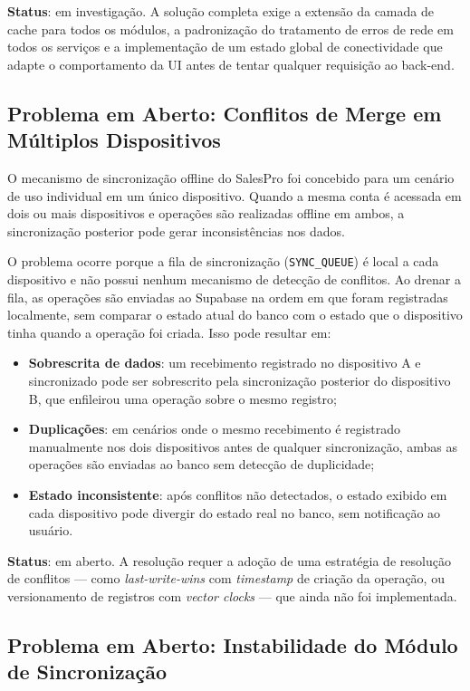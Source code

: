 \documentclass[
	12pt,				%
	oneside,			%
	a4paper,			%
	english,			%
	brazil				%
	]{abntex2}
\begin{document}
\textbf{Status}: em investigação. A solução completa exige a extensão da camada de cache para todos os módulos, a padronização do tratamento de erros de rede em todos os serviços e a implementação de um estado global de conectividade que adapte o comportamento da UI antes de tentar qualquer requisição ao back-end.

\subsection{Problema em Aberto: Conflitos de Merge em Múltiplos Dispositivos}

O mecanismo de sincronização offline do SalesPro foi concebido para um cenário de uso individual em um único dispositivo. Quando a mesma conta é acessada em dois ou mais dispositivos e operações são realizadas offline em ambos, a sincronização posterior pode gerar inconsistências nos dados.

O problema ocorre porque a fila de sincronização (\texttt{SYNC\_QUEUE}) é local a cada dispositivo e não possui nenhum mecanismo de detecção de conflitos. Ao drenar a fila, as operações são enviadas ao Supabase na ordem em que foram registradas localmente, sem comparar o estado atual do banco com o estado que o dispositivo tinha quando a operação foi criada. Isso pode resultar em:

\begin{itemize}
  \item \textbf{Sobrescrita de dados}: um recebimento registrado no dispositivo A e sincronizado pode ser sobrescrito pela sincronização posterior do dispositivo B, que enfileirou uma operação sobre o mesmo registro;
  \item \textbf{Duplicações}: em cenários onde o mesmo recebimento é registrado manualmente nos dois dispositivos antes de qualquer sincronização, ambas as operações são enviadas ao banco sem detecção de duplicidade;
  \item \textbf{Estado inconsistente}: após conflitos não detectados, o estado exibido em cada dispositivo pode divergir do estado real no banco, sem notificação ao usuário.
\end{itemize}

\textbf{Status}: em aberto. A resolução requer a adoção de uma estratégia de resolução de conflitos — como \textit{last-write-wins} com \textit{timestamp} de criação da operação, ou versionamento de registros com \textit{vector clocks} — que ainda não foi implementada.

\subsection{Problema em Aberto: Instabilidade do Módulo de Sincronização}
\end{document}
